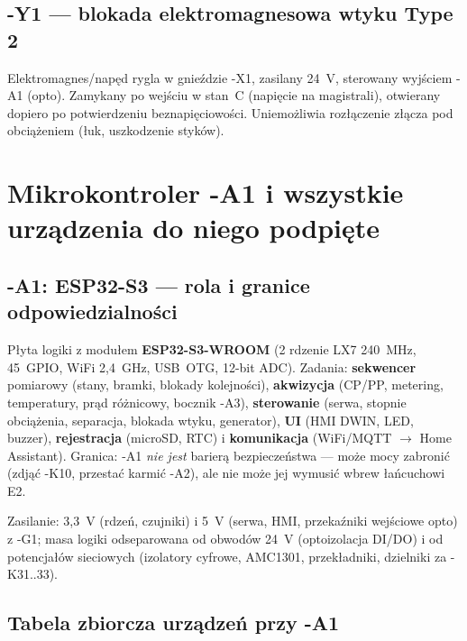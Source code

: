 \documentclass[11pt,a4paper]{article}
\begin{document}
\subsection{-Y1 --- blokada elektromagnesowa wtyku Type 2}
\label{sec:y1}
Elektromagnes/napęd rygla w gnieździe -X1, zasilany 24~V, sterowany wyjściem -A1 (opto).
Zamykany po wejściu w stan~C (napięcie na magistrali), otwierany dopiero po potwierdzeniu
beznapięciowości. Uniemożliwia rozłączenie złącza pod obciążeniem (łuk, uszkodzenie styków).

\section{Mikrokontroler -A1 i wszystkie urządzenia do niego podpięte}
\label{sec:mcu}

\subsection{-A1: ESP32-S3 --- rola i granice odpowiedzialności}
Płyta logiki z modułem \textbf{ESP32-S3-WROOM} (2 rdzenie LX7 240~MHz, 45~GPIO, WiFi 2,4~GHz,
USB~OTG, 12-bit ADC). Zadania: \textbf{sekwencer} pomiarowy (stany, bramki, blokady kolejności),
\textbf{akwizycja} (CP/PP, metering, temperatury, prąd różnicowy, bocznik -A3),
\textbf{sterowanie} (serwa, stopnie obciążenia, separacja, blokada wtyku, generator),
\textbf{UI} (HMI DWIN, LED, buzzer), \textbf{rejestracja} (microSD, RTC) i \textbf{komunikacja}
(WiFi/MQTT $\to$ Home Assistant). Granica: -A1 \emph{nie jest} barierą bezpieczeństwa --- może
mocy zabronić (zdjąć -K10, przestać karmić -A2), ale nie może jej wymusić wbrew łańcuchowi E2.

Zasilanie: 3,3~V (rdzeń, czujniki) i 5~V (serwa, HMI, przekaźniki wejściowe opto) z -G1;
masa logiki odseparowana od obwodów 24~V (optoizolacja DI/DO) i od potencjałów sieciowych
(izolatory cyfrowe, AMC1301, przekładniki, dzielniki za -K31..33).

\subsection{Tabela zbiorcza urządzeń przy -A1}
\label{sec:tabela-mcu}
\end{document}
